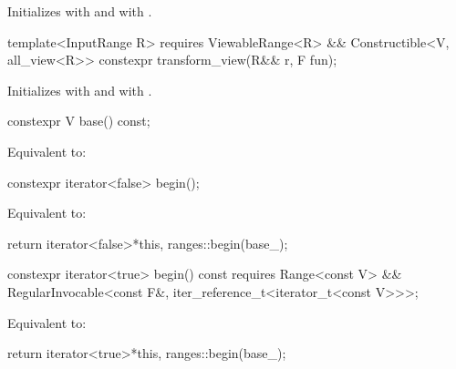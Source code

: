 \begin{itemdescr}
\pnum
\effects Initializes  with  and
 with .
\end{itemdescr}

%
\begin{itemdecl}
template<InputRange R>
  requires ViewableRange<R> && Constructible<V, all_view<R>>
constexpr transform_view(R&& r, F fun);
\end{itemdecl}

\begin{itemdescr}
\pnum
\effects Initializes  with 
and  with .
\end{itemdescr}

%
\begin{itemdecl}
constexpr V base() const;
\end{itemdecl}

\begin{itemdescr}
\pnum
\effects Equivalent to: 
\end{itemdescr}

%
\begin{itemdecl}
constexpr iterator<false> begin();
\end{itemdecl}

\begin{itemdescr}
\pnum
\effects Equivalent to:
\begin{codeblock}
return iterator<false>{*this, ranges::begin(base_)};
\end{codeblock}
\end{itemdescr}

%
\begin{itemdecl}
constexpr iterator<true> begin() const
  requires Range<const V> &&
           RegularInvocable<const F&, iter_reference_t<iterator_t<const V>>>;
\end{itemdecl}

\begin{itemdescr}
\pnum
\effects Equivalent to:
\begin{codeblock}
return iterator<true>{*this, ranges::begin(base_)};
\end{codeblock}
\end{itemdescr}

